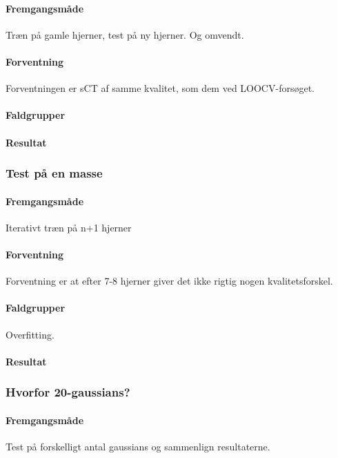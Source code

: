 \paragraph{Fremgangsmåde}
Træn på gamle hjerner, test på ny hjerner. Og omvendt.

\paragraph{Forventning}
Forventningen er sCT af samme kvalitet, som dem ved LOOCV-forsøget.

\paragraph{Faldgrupper}


\paragraph{Resultat}

\subsubsection{Test på en masse}
\paragraph{Fremgangsmåde}
Iterativt træn på n+1 hjerner

\paragraph{Forventning}
Forventning er at efter 7-8 hjerner giver det ikke rigtig nogen
kvalitetsforskel.

\paragraph{Faldgrupper}
Overfitting. 


\paragraph{Resultat}

\subsubsection{Hvorfor 20-gaussians?}

\paragraph{Fremgangsmåde}
Test på forskelligt antal gaussians og sammenlign resultaterne.

